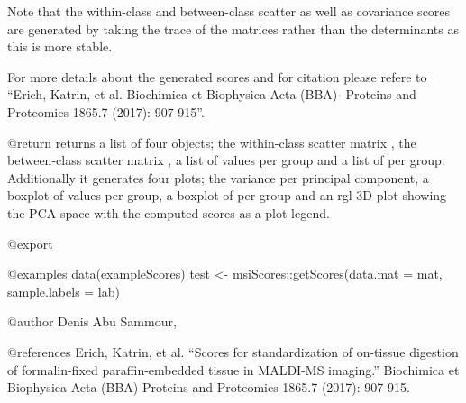 \documentclass[]{article}
\begin{document}
Note that the within-class and between-class scatter as well as
covariance scores are generated by taking the trace of the matrices
rather than the determinants as this is more stable.

For more details about the generated scores and for citation please
refere to ``Erich, Katrin, et al. Biochimica et Biophysica Acta (BBA)-
Proteins and Proteomics 1865.7 (2017): 907-915''.

@return returns a list of four objects; the within-class scatter matrix
, the between-class scatter matrix  , a list of
 values per group and a list of  per group.
Additionally it generates four plots; the variance per principal
component, a boxplot of  values per group, a boxplot of
 per group and an rgl 3D plot showing the PCA space with the
computed scores as a plot legend.

@export

@examples data(exampleScores) test \textless{}-
msiScores::getScores(data.mat = mat, sample.labels = lab)

@author Denis Abu Sammour, 

@references Erich, Katrin, et al. ``Scores for standardization of
on-tissue digestion of formalin-fixed paraffin-embedded tissue in
MALDI-MS imaging.'' Biochimica et Biophysica Acta (BBA)-Proteins and
Proteomics 1865.7 (2017): 907-915.
\end{document}
